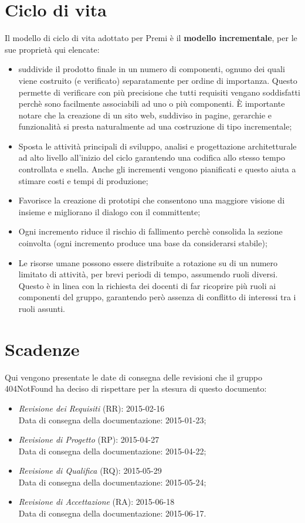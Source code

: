 \newpage
\section{Ciclo di vita}
Il modello di ciclo di vita adottato per Premi è il \textbf{modello incrementale}, per le sue proprietà qui elencate:

\begin{itemize}
	\item suddivide il prodotto finale in un numero di componenti, ognuno dei quali viene costruito (e verificato) separatamente per ordine di importanza. Questo permette di verificare con più precisione che tutti requisiti vengano soddisfatti perchè sono facilmente associabili ad uno o più componenti. È importante notare che la creazione di un sito web, suddiviso in pagine, gerarchie e funzionalità si presta naturalmente ad una costruzione di tipo incrementale;
	\item Sposta le attività principali di sviluppo, analisi e progettazione architetturale ad alto livello all'inizio del ciclo garantendo una codifica allo stesso tempo controllata e snella. Anche gli incrementi vengono pianificati e questo aiuta a stimare costi e tempi di produzione;
	\item Favorisce la creazione di prototipi che consentono una maggiore visione di insieme e migliorano il dialogo con il committente;
	\item Ogni incremento riduce il rischio di fallimento perchè consolida la sezione coinvolta (ogni incremento produce una base da considerarsi stabile);
	\item Le risorse umane possono essere distribuite a rotazione su di un numero limitato di attività, per brevi periodi di tempo, assumendo ruoli diversi. Questo è in linea con la richiesta dei docenti di far ricoprire più ruoli ai componenti del gruppo, garantendo però assenza di conflitto di interessi tra i ruoli assunti.
\end{itemize}	

\section{Scadenze}
Qui vengono presentate le date di consegna delle revisioni che il gruppo 404NotFound ha deciso di rispettare per la stesura di questo documento:

\begin{itemize}
	\item \textit{Revisione dei Requisiti} (RR): 2015-02-16 \\
	Data di consegna della documentazione: 2015-01-23;
	\item \textit{Revisione di Progetto} (RP): 2015-04-27 \\
	Data di consegna della documentazione: 2015-04-22;
	\item \textit{Revisione di Qualifica} (RQ): 2015-05-29 \\
	Data di consegna della documentazione: 2015-05-24;
	\item \textit{Revisione di Accettazione} (RA): 2015-06-18 \\
	Data di consegna della documentazione: 2015-06-17.
\end{itemize}
